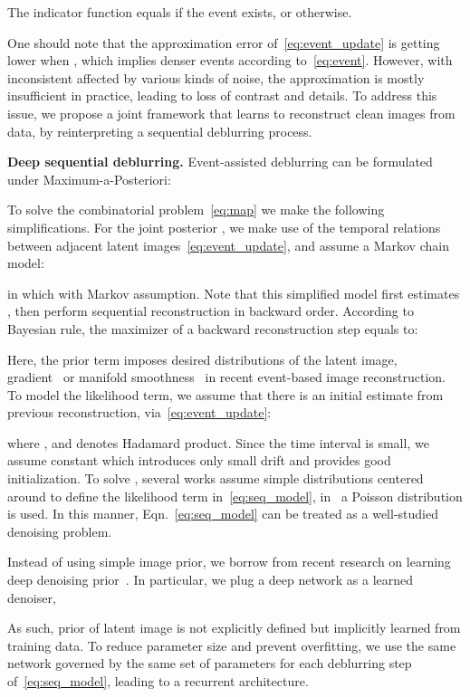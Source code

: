 \documentclass[10pt,twocolumn,letterpaper]{article}
\begin{document}
The indicator function  equals  if the event  exists, or  otherwise.

One should note that the approximation error of~\eqref{eq:event_update} is getting lower when , which implies denser events according to~\eqref{eq:event}. However, with inconsistent  affected by various kinds of noise, the approximation is mostly insufficient in practice, leading to loss of contrast and details. To address this issue, we propose a joint framework that learns to reconstruct clean images from data, by reinterpreting a sequential deblurring process.

\textbf{Deep sequential deblurring.} Event-assisted deblurring can be formulated under Maximum-a-Posteriori:

To solve the combinatorial problem~\eqref{eq:map} we make the following simplifications. For the joint posterior , we make use of the temporal relations between adjacent latent images~\eqref{eq:event_update}, and assume a Markov chain model:

in which  with Markov assumption. Note that this simplified model first estimates , then perform sequential reconstruction in backward order. According to Bayesian rule, the maximizer of a backward reconstruction step equals to:
 
Here, the prior term  imposes desired distributions of the latent image, \eg~ gradient~\cite{BardowCVPR16} or manifold smoothness~\cite{MundaIJCV18} in recent event-based image reconstruction. To model the likelihood term, we assume that there is an initial estimate from previous reconstruction, via~\eqref{eq:event_update}:

where , and  denotes Hadamard product. Since the time interval is small, we assume constant  which introduces only small drift and provides good initialization. To solve , several works assume simple distributions centered around  to define the likelihood term in~\eqref{eq:seq_model}, \eg in~\cite{MundaIJCV18} a Poisson distribution is used. In this manner, Eqn.~\eqref{eq:seq_model} can be treated as a well-studied denoising problem.

Instead of using simple image prior, we borrow from recent research on learning deep denoising prior~\cite{ZhangICCV17,ZhangCVPR19}. In particular, we plug a deep network  as a learned denoiser,

As such, prior of latent image  is not explicitly defined but implicitly learned from training data. To reduce parameter size and prevent overfitting, we use the same network governed by the same set of parameters for each deblurring step of~\eqref{eq:seq_model}, leading to a recurrent architecture.
\end{document}
